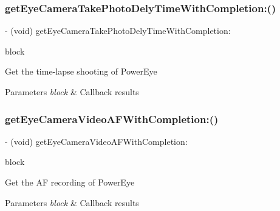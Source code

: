 \subsubsection{\texorpdfstring{get\+Eye\+Camera\+Take\+Photo\+Dely\+Time\+With\+Completion\+:()}{getEyeCameraTakePhotoDelyTimeWithCompletion:()}}
{\footnotesize\ttfamily -\/ (void) get\+Eye\+Camera\+Take\+Photo\+Dely\+Time\+With\+Completion\+: \begin{DoxyParamCaption}\item[{(void($^\wedge$)(N\+S\+Integer time, N\+S\+Error $\ast$\+\_\+\+Nullable error))}]{block }\end{DoxyParamCaption}}

Get the time-\/lapse shooting of Power\+Eye


\begin{DoxyParams}{Parameters}
{\em block} & Callback results \\
\hline
\end{DoxyParams}
\mbox{\label{interface_p_v_eye_camera_a52c778cbe91e70ebe3f4fb4d4f18860a}} 
\subsubsection{\texorpdfstring{get\+Eye\+Camera\+Video\+A\+F\+With\+Completion\+:()}{getEyeCameraVideoAFWithCompletion:()}}
{\footnotesize\ttfamily -\/ (void) get\+Eye\+Camera\+Video\+A\+F\+With\+Completion\+: \begin{DoxyParamCaption}\item[{(void($^\wedge$)(P\+V\+Eye\+Camera\+Video\+AF video\+AF, N\+S\+Error $\ast$\+\_\+\+Nullable error))}]{block }\end{DoxyParamCaption}}

Get the AF recording of Power\+Eye


\begin{DoxyParams}{Parameters}
{\em block} & Callback results \\
\hline
\end{DoxyParams}
\mbox{\label{interface_p_v_eye_camera_affbbc33f237c3eb26b14f6a4d60d956d}} 
